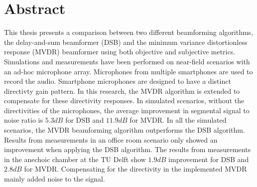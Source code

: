 \chapter*{Abstract}

This thesis presents a comparison between two different beamforming algorithms, the delay-and-sum beamformer (DSB) and the minimum variance distortionless response (MVDR) beamformer using both objective and subjective metrics. Simulations and measurements have been performed on near-field scenarios with an ad-hoc microphone array. Microphones from multiple smartphones are used to record the audio. Smartphone microphones are designed to have a distinct directivty gain pattern. In this research, the MVDR algorithm is extended to compensate for these directivity responses. In simulated scenarios, without the directivities of the microphones, the average improvement in segmental signal to noise ratio is $5.3 dB$ for DSB and $11.9 dB$ for MVDR. In all the simulated scenarios, the MVDR beamforming algorithm outperforms the DSB algorithm. Results from measurements in an office room scenario only showed an improvement when applying the DSB algorithm. The results from measurements in the anechoic chamber at the TU Delft show $1.9 dB$ improvement for DSB and $2.8 dB$ for MVDR.
Compensating for the directivity in the implemented MVDR mainly added noise to the signal.